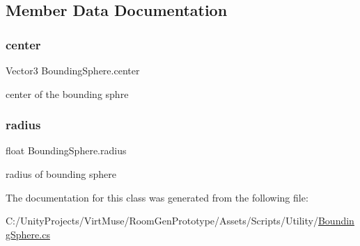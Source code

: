 \subsection{Member Data Documentation}
\mbox{\label{class_bounding_sphere_a0996d0f450c5e7fcca8446ebbd8ddc20}} 
\subsubsection{\texorpdfstring{center}{center}}
{\footnotesize\ttfamily Vector3 Bounding\+Sphere.\+center}



center of the bounding sphre 

\mbox{\label{class_bounding_sphere_ad507cd54bc4021617024c2545fe9379c}} 
\subsubsection{\texorpdfstring{radius}{radius}}
{\footnotesize\ttfamily float Bounding\+Sphere.\+radius}



radius of bounding sphere 



The documentation for this class was generated from the following file\+:\begin{DoxyCompactItemize}
\item 
C\+:/\+Unity\+Projects/\+Virt\+Muse/\+Room\+Gen\+Prototype/\+Assets/\+Scripts/\+Utility/\mbox{\hyperlink{_bounding_sphere_8cs}{Bounding\+Sphere.\+cs}}\end{DoxyCompactItemize}

